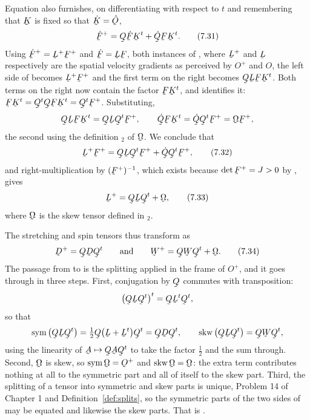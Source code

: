 Equation  also furnishes, on differentiating with respect to
$t$ and remembering that $\bK$ is fixed so that $\dot\bK=\hOb$,
\begin{equation}
   \dot\bF^{+}=\bQ\dot\bF\bK^{t}+\dot\bQ\bF\bK^{t}.
   \tag{7.31}\label{eq:7.31}
\end{equation}
Using $\dot\bF^{+}=\bL^{+}\bF^{+}$ and $\dot\bF=\bL\bF$, both instances
of , where $\bL^{+}$ and $\bL$ respectively are the spatial
velocity gradients as perceived by $O^{+}$ and $O$, the left side of
 becomes $\bL^{+}\bF^{+}$ and the first term on the right
becomes $\bQ\bL\bF\bK^{t}$. Both terms on the right now contain the
factor $\bF\bK^{t}$, and  identifies it:
$\bF\bK^{t}=\bQ^{t}\bQ\bF\bK^{t}=\bQ^{t}\bF^{+}$. Substituting,
\[
   \bQ\bL\bF\bK^{t}=\bQ\bL\bQ^{t}\bF^{+},
   \qquad
   \dot\bQ\bF\bK^{t}=\dot\bQ\bQ^{t}\bF^{+}=\bOm\bF^{+},
\]
the second using the definition $_{2}$ of $\bOm$. We conclude
that
\begin{equation}
   \bL^{+}\bF^{+}=\bQ\bL\bQ^{t}\bF^{+}+\dot\bQ\bQ^{t}\bF^{+},
   \tag{7.32}\label{eq:7.32}
\end{equation}
and right-multiplication by $(\bF^{+})^{-1}$, which exists because
$\det\bF^{+}=J>0$ by , gives
\begin{equation}
   \bL^{+}=\bQ\bL\bQ^{t}+\bOm ,
   \tag{7.33}\label{eq:7.33}
\end{equation}
where $\bOm$ is the skew tensor defined in $_{2}$.

The stretching and spin tensors thus transform as
\begin{equation}
   \bD^{+}=\bQ\bD\bQ^{t}
   \qquad\text{and}\qquad
   \bW^{+}=\bQ\bW\bQ^{t}+\bOm .
   \tag{7.34}\label{eq:7.34}
\end{equation}
The passage from  to  is the splitting 
applied in the frame of $O^{+}$, and it goes through in three steps.
First, conjugation by $\bQ$ commutes with transposition:
\[
   \big(\bQ\bL\bQ^{t}\big)^{t}=\bQ\bL^{t}\bQ^{t},
\]
so that
\[
   \Sym\big(\bQ\bL\bQ^{t}\big)
   =\tfrac12\bQ\big(\bL+\bL^{t}\big)\bQ^{t}=\bQ\bD\bQ^{t},
   \qquad
   \Skw\big(\bQ\bL\bQ^{t}\big)=\bQ\bW\bQ^{t},
\]
using the linearity of $\bA\mapsto\bQ\bA\bQ^{t}$ to take the factor
$\tfrac12$ and the sum through. Second, $\bOm$ is skew, so
$\Sym\bOm=\Ob^{+}$ and $\Skw\bOm=\bOm$: the extra term contributes
nothing at all to the symmetric part and all of itself to the skew part.
Third, the splitting of a tensor into symmetric and skew parts is unique,
Problem 14 of Chapter 1 and Definition~\ref{def:splits}, so the
symmetric parts of the two sides of  may be equated and
likewise the skew parts. That is .

